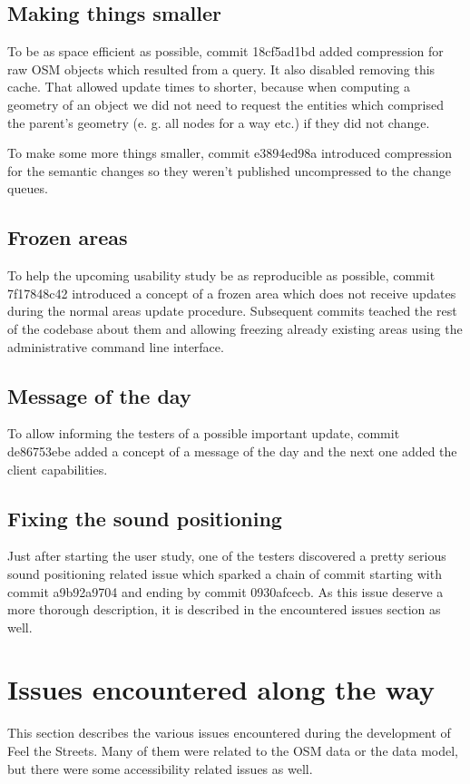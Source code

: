 \documentclass[nolof,digital]{fithesis3}
\begin{document}
\subsection{Making things smaller}
To be as space efficient as possible, commit 18cf5ad1bd added compression for raw OSM objects which resulted from a query. It also disabled removing this cache. That allowed update times to shorter, because when computing a geometry of an object we did not need to request the entities which comprised the parent's geometry (e. g. all nodes for a way etc.) if they did not change.

To make some more things smaller, commit e3894ed98a introduced compression for the semantic changes so they weren't published uncompressed to the change queues.
\subsection{Frozen areas}
To help the upcoming usability study be as reproducible as possible, commit 7f17848c42 introduced a concept of a frozen area which does not receive updates during the normal areas update procedure. Subsequent commits teached the rest of the codebase about them and allowing freezing already existing areas using the administrative command line interface.
\subsection{Message of the day}
To allow informing the testers of a possible important update, commit de86753ebe added a concept of a message of the day and the next one added the client capabilities.
\subsection{Fixing the sound positioning}
Just after starting the user study, one of the testers discovered a pretty serious sound positioning related issue which sparked a chain of commit starting with commit a9b92a9704 and ending by commit 0930afcecb. As this issue deserve a more thorough description, it is described in the encountered issues section as well.
\section{Issues encountered along the way}
This section describes the various issues encountered during the development of Feel the Streets. Many of them were related to the OSM data or the data model, but there were some accessibility related issues as well.
\end{document}

